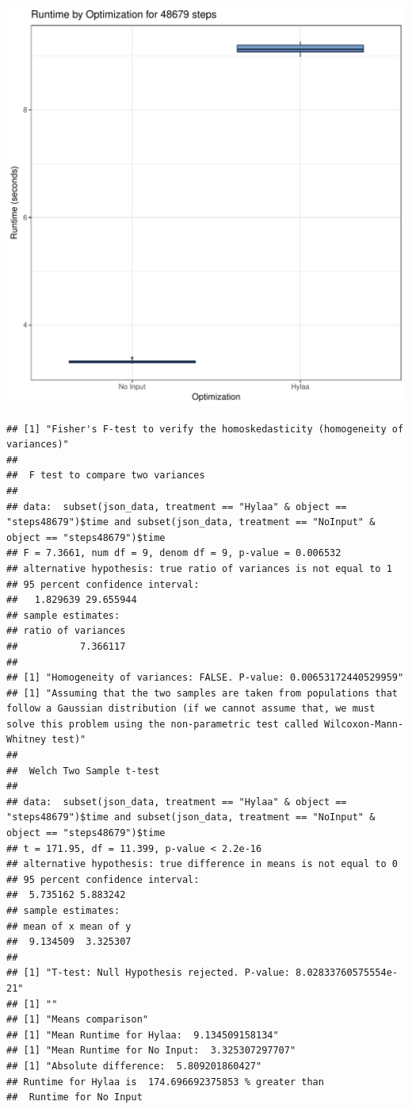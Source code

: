 \documentclass{article}\usepackage[]{graphicx}\usepackage[]{color}
\makeatletter
\def\maxwidth{ %
  \ifdim\Gin@nat@width>\linewidth
    \linewidth
  \else
    \Gin@nat@width
  \fi
}
\newenvironment{kframe}{%
 \def\at@end@of@kframe{}%
 \ifinner\ifhmode%
  \def\at@end@of@kframe{\end{minipage}}%
  \begin{minipage}{\columnwidth}%
 \fi\fi%
 \def\FrameCommand##1{\hskip\@totalleftmargin \hskip-\fboxsep
 \colorbox{shadecolor}{##1}\hskip-\fboxsep
     \hskip-\linewidth \hskip-\@totalleftmargin \hskip\columnwidth}%
 \MakeFramed {\advance\hsize-\width
   \@totalleftmargin\z@ \linewidth\hsize
   \@setminipage}}%
 {\par\unskip\endMakeFramed%
 \at@end@of@kframe}
\newenvironment{knitrout}{}{} %
\makeatother
\begin{document}
\begin{knitrout}
\color{fgcolor}
\includegraphics[width=\maxwidth]{figure/RH4_steps48679-1} 
\begin{kframe}\begin{verbatim}
## [1] "Fisher's F-test to verify the homoskedasticity (homogeneity of variances)"
## 
## 	F test to compare two variances
## 
## data:  subset(json_data, treatment == "Hylaa" & object == "steps48679")$time and subset(json_data, treatment == "NoInput" & object == "steps48679")$time
## F = 7.3661, num df = 9, denom df = 9, p-value = 0.006532
## alternative hypothesis: true ratio of variances is not equal to 1
## 95 percent confidence interval:
##   1.829639 29.655944
## sample estimates:
## ratio of variances 
##           7.366117 
## 
## [1] "Homogeneity of variances: FALSE. P-value: 0.00653172440529959"
## [1] "Assuming that the two samples are taken from populations that follow a Gaussian distribution (if we cannot assume that, we must solve this problem using the non-parametric test called Wilcoxon-Mann-Whitney test)"
## 
## 	Welch Two Sample t-test
## 
## data:  subset(json_data, treatment == "Hylaa" & object == "steps48679")$time and subset(json_data, treatment == "NoInput" & object == "steps48679")$time
## t = 171.95, df = 11.399, p-value < 2.2e-16
## alternative hypothesis: true difference in means is not equal to 0
## 95 percent confidence interval:
##  5.735162 5.883242
## sample estimates:
## mean of x mean of y 
##  9.134509  3.325307 
## 
## [1] "T-test: Null Hypothesis rejected. P-value: 8.02833760575554e-21"
## [1] ""
## [1] "Means comparison"
## [1] "Mean Runtime for Hylaa:  9.134509158134"
## [1] "Mean Runtime for No Input:  3.325307297707"
## [1] "Absolute difference:  5.809201860427"
## Runtime for Hylaa is  174.696692375853 % greater than 
##  Runtime for No Input
\end{verbatim}
\end{kframe}
\end{knitrout}
\end{document}
